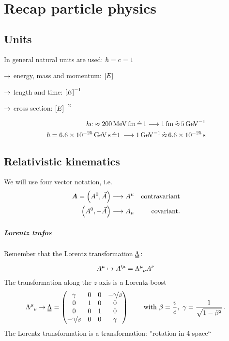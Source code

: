 \chapter{Recap particle physics}
\section{Units}
In general natural units are used: $\hbar = \mathrm c = 1$
\begin{compactitem}
    \item[$\rightarrow$] energy, mass and momentum: $\qty[ E]$
    \item[$\rightarrow$] length and time: $\qty[ E] ^{-1}$
    \item[$\rightarrow$] cross section: $\qty[ E] ^{-2}$
\end{compactitem}
\begin{example}
\begin{align*}
    \hbar \mr c \approx \SI{200}{\mega\eV\femto\meter} \,\hat =\, 1 \longrightarrow \SI{1}{\femto \meter} \,\hat\approx\, \SI{5}{\per\giga\eV}\\
    \hbar = \SI{6.6 e-25}{\giga \eV \second} \,\hat = 1\, \longrightarrow \SI{1}{\per \giga \eV} \,\hat \approx\, \SI{6.6e-25}{\second}
\end{align*}
\end{example}
\section{Relativistic kinematics}
We will use four vector notation, i.e.
\begin{align}
    {\bm{A}} = \qty( A^0, \vec A) \longrightarrow A^\mu & & \text{contravariant}\\
    \qty( A^0, -\vec A) \longrightarrow A_\mu & & \text{covariant.}
\end{align}
\paragraph{Lorentz trafos}
Remember that the Lorentz transformation $\uul \Lambda$:
\begin{align}
    A^\mu \mapsto A'^\mu = \tensor{\Lambda}{^\mu_\nu}A^\nu
\end{align}
The transformation along the $z$-axis  is a Lorentz-boost
\begin{align}
    \tensor{\Lambda}{^\mu_\nu} \ra \uul \Lambda = \mqty(\gamma & 0 &  0 &- \nicefrac \gamma \beta \\ 0 & 1 & 0 & 0 \\ 0 & 0 & 1 & 0 \\ - \nicefrac \gamma \beta & 0 & 0 & \gamma) \qquad \text{ with } \beta = \frac vc, \ \gamma = \frac{1}{\sqrt{1-\beta^2}}\,.
\end{align}
The Lorentz transformation is a  transformation: ''rotation in 4-space``

